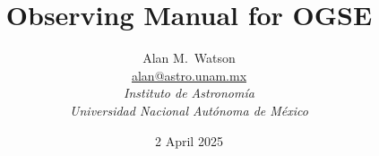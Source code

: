 \title{
\bfseries Observing Manual for OGSE
}

\author{
Alan M.\ Watson\\
\href{mailto:alan@astro.unam.mx}{alan@astro.unam.mx}\\[\medskipamount]
\itshape Instituto de Astronomía\\
\itshape Universidad Nacional Autónoma de México
}

\date{2 April 2025}

\maketitle

\tableofcontents